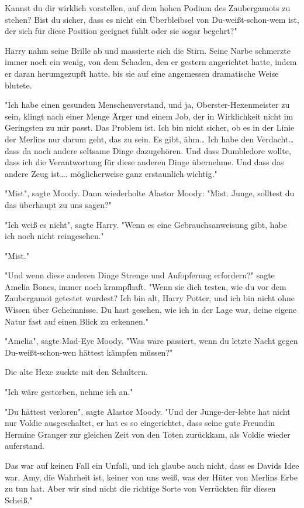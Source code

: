 {Kannst du dir wirklich vorstellen, auf dem hohen Podium des Zaubergamots zu stehen? Bist du sicher, dass es nicht ein Überbleibsel von Du-weißt-schon-wem ist, der sich für diese Position geeignet fühlt oder sie sogar begehrt?"

Harry nahm seine Brille ab und massierte sich die Stirn. Seine Narbe schmerzte immer noch ein wenig, von dem Schaden, den er gestern angerichtet hatte, indem er daran herumgezupft hatte, bis sie auf eine angemessen dramatische Weise blutete.

"Ich habe einen gesunden Menschenverstand, und ja, Oberster-Hexenmeister zu sein, klingt nach einer Menge Ärger und einem Job, der in Wirklichkeit nicht im Geringsten zu mir passt. Das Problem ist. Ich bin nicht sicher, ob es in der Linie der Merlins nur darum geht, das zu sein. Es gibt, ähm… Ich habe den Verdacht… dass da noch andere seltsame Dinge dazugehören. Und dass Dumbledore wollte, dass ich die Verantwortung für diese anderen Dinge übernehme. Und dass das andere Zeug ist…. möglicherweise ganz erstaunlich wichtig."

"Mist", sagte Moody. Dann wiederholte Alastor Moody: "Mist. Junge, solltest du das überhaupt zu uns sagen?"

"Ich weiß es nicht", sagte Harry. "Wenn es eine Gebrauchsanweisung gibt, habe ich noch nicht reingesehen."

"Mist."

"Und wenn diese anderen Dinge Strenge und Aufopferung erfordern?" sagte Amelia Bones, immer noch krampfhaft. "Wenn sie dich testen, wie du vor dem Zaubergamot getestet wurdest? Ich bin alt, Harry Potter, und ich bin nicht ohne Wissen über Geheimnisse. Du hast gesehen, wie ich in der Lage war, deine eigene Natur fast auf einen Blick zu erkennen."

"Amelia", sagte Mad-Eye Moody. "Was wäre passiert, wenn du letzte Nacht gegen Du-weißt-schon-wen hättest kämpfen müssen?"

Die alte Hexe zuckte mit den Schultern.

"Ich wäre gestorben, nehme ich an."

"Du hättest verloren", sagte Alastor Moody. "Und der Junge-der-lebte hat nicht nur Voldie ausgeschaltet, er hat es so eingerichtet, dass seine gute Freundin Hermine Granger zur gleichen Zeit von den Toten zurückkam, als Voldie wieder auferstand.

Das war auf keinen Fall ein Unfall, und ich glaube auch nicht, dass es Davids Idee war. Amy, die Wahrheit ist, keiner von uns weiß, was der Hüter von Merlins Erbe zu tun hat. Aber wir sind nicht die richtige Sorte von Verrückten für diesen Scheiß."

}
